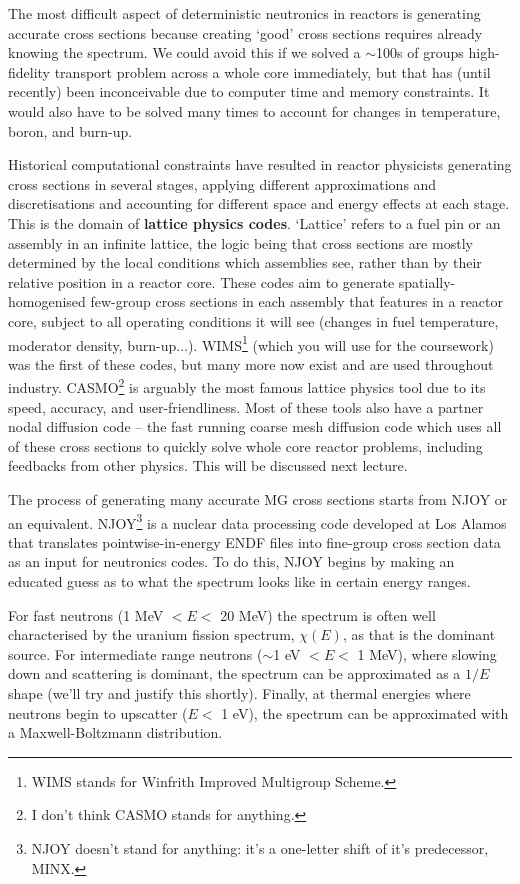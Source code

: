 \documentclass{article}
\begin{document}
The most difficult aspect of deterministic neutronics in reactors is generating accurate cross sections because creating `good' cross sections requires already knowing the spectrum. We could avoid this if we solved a $\sim$100s of groups high-fidelity transport problem across a whole core immediately, but that has (until recently) been inconceivable due to computer time and memory constraints. It would also have to be solved many times to account for changes in temperature, boron, and burn-up.

Historical computational constraints have resulted in reactor physicists generating cross sections in several stages, applying different approximations and discretisations and accounting for different space and energy effects at each stage. This is the domain of \textbf{lattice physics codes}. `Lattice' refers to a fuel pin or an assembly in an infinite lattice, the logic being that cross sections are mostly determined by the local conditions which assemblies see, rather than by their relative position in a reactor core. These codes aim to generate spatially-homogenised few-group cross sections in each assembly that features in a reactor core, subject to all operating conditions it will see (changes in fuel temperature, moderator density, burn-up...). WIMS\footnote{WIMS stands for Winfrith Improved Multigroup Scheme.} (which you will use for the coursework) was the first of these codes, but many more now exist and are used throughout industry. CASMO\footnote{I don't think CASMO stands for anything.} is arguably the most famous lattice physics tool due to its speed, accuracy, and user-friendliness. Most of these tools also have a partner nodal diffusion code -- the fast running coarse mesh diffusion code which uses all of these cross sections to quickly solve whole core reactor problems, including feedbacks from other physics. This will be discussed next lecture.

The process of generating many accurate MG cross sections starts from NJOY or an equivalent. NJOY\footnote{NJOY doesn't stand for anything: it's a one-letter shift of it's predecessor, MINX.} is a nuclear data processing code developed at Los Alamos that translates pointwise-in-energy ENDF files into fine-group cross section data as an input for neutronics codes. To do this, NJOY begins by making an educated guess as to what the spectrum looks like in certain energy ranges.

For fast neutrons (1 MeV $< E <$ 20 MeV) the spectrum is often well characterised by the uranium fission spectrum, $\chi(E)$, as that is the dominant source. For intermediate range neutrons ($\sim$1 eV $< E <$ 1 MeV), where slowing down and scattering is dominant, the spectrum can be approximated as a $1/E$ shape (we'll try and justify this shortly). Finally, at thermal energies where neutrons begin to upscatter ($E < $ 1 eV), the spectrum can be approximated with a Maxwell-Boltzmann distribution. 
\end{document}
